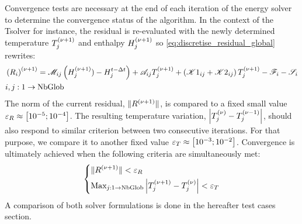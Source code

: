%
Convergence tests are necessary at the end of each iteration of the energy solver to determine 
the convergence status of the algorithm. In the context of the Tsolver for instance, the residual 
is re-evaluated with the newly determined temperature $\Tj^\iterplus$ and enthalpy $\Hj^\iterplus$ so \cref{eq:discretise_residual_global} rewrites:
\begin{align}
\begin{split}
\label{eq:discretise_residual_global_new}
& \brac{R_i}^\iterplus = \Mij \brac{\Hj^\iterplus) - \Hjtminus} + \Aij \Tj^\iterplus + \brac{\Kija + \Kijb}\Tj^\iterplus -\Fi - \Si \\
& i,j:1 \rightarrow \text{NbGlob}
\end{split}
\end{align}
The norm of the current residual, $\norm{R^\iterplus}$, is compared to a fixed small 
value $\varepsilon_R \approx \crochet{\num{d-5};\num{d-4}}$. The resulting temperature variation, 
$\abval{\Tj^\iter-\Tj^\iterminus}$, should also respond to similar criterion between two consecutive 
iterations. For that purpose, we compare it to another fixed value $\varepsilon_T \approx \crochet{\num{d-3};\num{d-2}}$.
Convergence is ultimately achieved when the following criteria are simultaneously met:
\begin{equation}
\label{eq:energy_convergence_criteria}
   \left\{
   \begin{aligned}
      & \norm{R^\iterplus} < \varepsilon_R \\
	  & \text{Max}_{j:1 \rightarrow \text{NbGlob}} \abval{\Tj^\iterplus-\Tj^\iter} < \varepsilon_T
    \end{aligned}
    \right.
\end{equation}
A comparison of both solver formulations is done in the hereafter test cases section.
%
%
%
